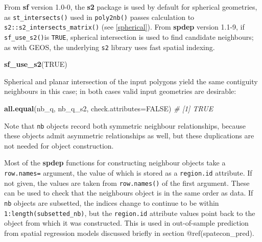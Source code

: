 \documentclass[]{book}
\newenvironment{Shaded}{\begin{snugshade}}{\end{snugshade}}
\newcommand{\CommentTok}[1]{\textcolor[rgb]{0.56,0.35,0.01}{\textit{#1}}}
\newcommand{\DataTypeTok}[1]{\textcolor[rgb]{0.13,0.29,0.53}{#1}}
\newcommand{\KeywordTok}[1]{\textcolor[rgb]{0.13,0.29,0.53}{\textbf{#1}}}
\newcommand{\NormalTok}[1]{#1}
\newcommand{\OperatorTok}[1]{\textcolor[rgb]{0.81,0.36,0.00}{\textbf{#1}}}
\newcommand{\OtherTok}[1]{\textcolor[rgb]{0.56,0.35,0.01}{#1}}
\newcommand{\StringTok}[1]{\textcolor[rgb]{0.31,0.60,0.02}{#1}}
\begin{document}
From \textbf{sf} version 1.0-0, the \textbf{s2} package \citep{R-s2} is used by default for spherical geometries, as \texttt{st\_intersects()} used in \texttt{poly2nb()} passes calculation to \texttt{s2::s2\_intersects\_matrix()} (see \ref{spherical}). From \textbf{spdep} version 1.1-9, if \texttt{sf\_use\_s2()}is \texttt{TRUE}, spherical intersection is used to find candidate neighbours; as with GEOS, the underlying \texttt{s2} library uses fast spatial indexing.

\begin{Shaded}
\begin{Highlighting}[]
\KeywordTok{sf_use_s2}\NormalTok{(}\OtherTok{TRUE}\NormalTok{)}
\end{Highlighting}
\end{Shaded}

\begin{Shaded}
\end{Shaded}

Spherical and planar intersection of the input polygons yield the same contiguity neighbours in this case; in both cases valid input geometries are desirable:

\begin{Shaded}
\begin{Highlighting}[]
\KeywordTok{all.equal}\NormalTok{(nb_q, nb_q_s2, }\DataTypeTok{check.attributes=}\OtherTok{FALSE}\NormalTok{)}
\CommentTok{# [1] TRUE}
\end{Highlighting}
\end{Shaded}

Note that \texttt{nb} objects record both symmetric neighbour relationships, because these objects admit asymmetric relationships as well, but these duplications are not needed for object construction.

Most of the \textbf{spdep} functions for constructing neighbour objects take a \texttt{row.names=} argument, the value of which is stored as a \texttt{region.id} attribute. If not given, the values are taken from \texttt{row.names()} of the first argument. These can be used to check that the neighbours object is in the same order as data. If \texttt{nb} objects are subsetted, the indices change to continue to be within \texttt{1:length(subsetted\_nb)}, but the \texttt{region.id} attribute values point back to the object from which it was constructed. This is used in out-of-sample prediction from spatial regression models discussed briefly in section @ref(spatecon\_pred).
\end{document}
